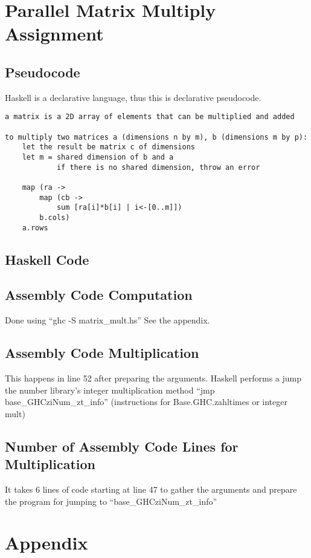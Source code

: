 \documentclass[12pt]{article}
\begin{document}
\section{Parallel Matrix Multiply Assignment}
\subsection{Pseudocode}
Haskell is a declarative language, thus this is declarative pseudocode.

\begin{verbatim}
a matrix is a 2D array of elements that can be multiplied and added

to multiply two matrices a (dimensions n by m), b (dimensions m by p):
    let the result be matrix c of dimensions
    let m = shared dimension of b and a
            if there is no shared dimension, throw an error

    map (ra ->
        map (cb ->
            sum [ra[i]*b[i] | i<-[0..m]])
        b.cols)
    a.rows
\end{verbatim}

\subsection{Haskell Code}

\subsection{Assembly Code Computation}
Done using ``ghc -S matrix\_mult.hs'' See the appendix.
\subsection{Assembly Code Multiplication}
This happens in line 52 after preparing the arguments.
Haskell performs a jump the number library's integer multiplication
method ``jmp base\_GHCziNum\_zt\_info'' (instructions for Base.GHC.zahltimes or
integer mult)
\subsection{Number of Assembly Code Lines for Multiplication}
It takes 6 lines of code starting at line 47 to gather the arguments and
prepare the program for jumping to ``base\_GHCziNum\_zt\_info''

\section{Appendix}

\end{document}
